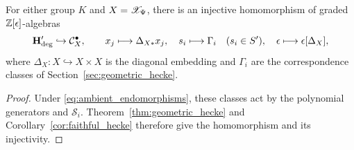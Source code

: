 \begin{corollary}\label{thm:faithful_convolution_embedding}
For either group $K$ and $X=\mathscr X_\Psi$, there is an injective homomorphism of graded $\mathbb Z[\epsilon]$-algebras
\[
 \mathbf H_{\mathrm{deg}}'\hookrightarrow\mathcal C_X^\bullet,\qquad
 x_j\longmapsto\Delta_{X*}x_j,\quad
 s_i\longmapsto\Gamma_i\quad(s_i\in S'),\quad
 \epsilon\longmapsto\epsilon[\Delta_X],
\]
where $\Delta_X:X\hookrightarrow X\times X$ is the diagonal embedding and $\Gamma_i$ are the correspondence classes of Section~\ref{sec:geometric_hecke}.
\end{corollary}

\begin{proof}
Under \eqref{eq:ambient_endomorphisms}, these classes act by the polynomial generators
and $\mathcal S_i$. Theorem~\ref{thm:geometric_hecke} and
Corollary~\ref{cor:faithful_hecke} therefore give the homomorphism and its injectivity.
\end{proof}


